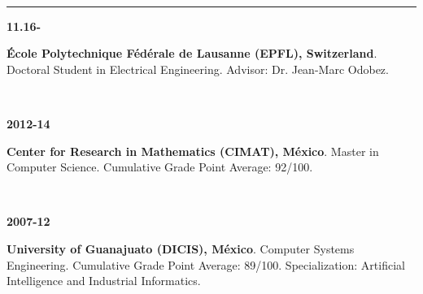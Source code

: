 \documentclass[10 pt]{article}
\newcommand{\mypartitle}[2][2.]{\vspace*{-#1 ex}~\\{\noindent {\bf #2}}}
\begin{document}
\medskip

\mypartitle{Education}
\medskip
\hrule height 0.05cm
\medskip


\begin{minipage}[t]{.1\textwidth}

\vspace{-.5cm}
\hspace{-.5cm}\textbf{11.16-}

\end{minipage}\begin{minipage}{0.87\textwidth}

\textbf{École Polytechnique Fédérale de Lausanne (EPFL), Switzerland}. 
Doctoral Student in Electrical Engineering. Advisor: Dr. Jean-Marc Odobez.

\end{minipage}\\


\begin{minipage}[t]{.1\textwidth}

\vspace{-.5cm}
\hspace{-.5cm}\textbf{2012-14}

\end{minipage}\begin{minipage}{0.87\textwidth}

\textbf{Center for Research in Mathematics (CIMAT), México}. Master in Computer Science.
Cumulative Grade Point Average: 92/100.

\end{minipage}\\

\begin{minipage}{.1\textwidth}

\vspace{-.5cm}
\hspace{-.5cm}\textbf{2007-12}

\end{minipage}\begin{minipage}{0.87\textwidth}

\textbf{University of Guanajuato (DICIS), México}. Computer Systems Engineering.
Cumulative Grade Point Average: 89/100. Specialization: Artificial Intelligence
and Industrial Informatics. 

\end{minipage}\\
\end{document}
